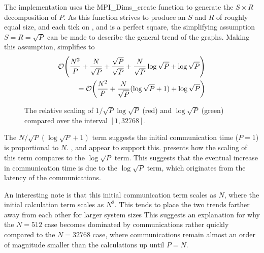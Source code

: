 The implementation uses the MPI\_Dims\_create function to generate
the $S\times{}R$ decomposition of $P$.
%
As this function strives to
produce an $S$ and $R$ of roughly equal size, and each tick on
,
 and
is a perfect square, the simplifying assumption $S = R = \sqrt{P}$
can be made to describe the general trend of the graphs.
%
Making this assumption,
simplifies to
\begin{equation}
    \label{eqn:replicated_systolic_pair_operation_simplified_time}
    \begin{split}
        \mathcal{O}{\left({ 
            \frac{N^2}{P}
            + \frac{N}{\sqrt{P}}
            + \frac{\sqrt{P}}{\sqrt{P}}
            + \frac{N}{\sqrt{P}}\log{\sqrt{P}}
            + \log{\sqrt{P}}
         }\right)} \\
        = \mathcal{O}{\left({ 
            \frac{N^2}{P}
            + \frac{N}{\sqrt{P}}(\log{\sqrt{P}}+1)
            + \log{\sqrt{P}}
         }\right)}
    \end{split}
\end{equation}

\begin{figure}
    
    \caption{
        The relative scaling of
        $1/\sqrt{P}\log{\sqrt{P}}$ (red) and
        $\log{\sqrt{P}}$ (green)
        compared over the interval $[1,32768]$.
    }
    \label{fig:log_vs_log_sqrt_p}
\end{figure}

The $N/\sqrt{P}(\log{\sqrt{P}}+1)$ term suggests the initial communication
time ($P = 1$) is proportional to $N$.
%
,
 and
appear to support this.
%
 presents how the scaling of this term compares
to the $\log{\sqrt{P}}$ term.
%
This suggests that the eventual increase in communication time is
due to the $\log{\sqrt{P}}$ term, which originates from the latency
of the communications.

An interesting note is that this initial communication term scales as $N$,
where the initial calculation term scales as $N^2$.
%
This tends to place the two trends farther away from each other for
larger system sizes
%
This suggests an explanation for why the $N = 512$
case becomes dominated by communications rather quickly compared to the
$N = 32768$ case, where communications remain almost an order of
magnitude smaller than the calculations up until $P = N$.
